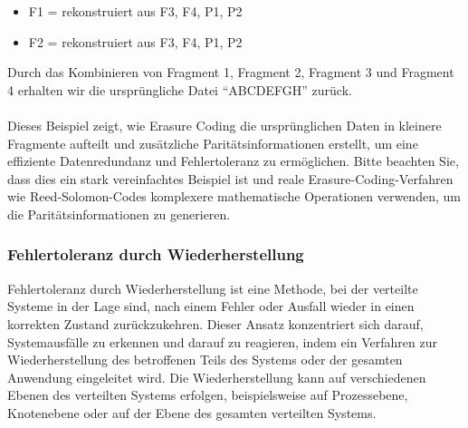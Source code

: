 \begin{itemize}
\item F1 = rekonstruiert aus F3, F4, P1, P2
\item F2 = rekonstruiert aus F3, F4, P1, P2
\end{itemize}  
Durch das Kombinieren von Fragment 1, Fragment 2, Fragment 3 und Fragment 4 erhalten wir die ursprüngliche Datei \enquote{ABCDEFGH} zurück.
\\\\
Dieses Beispiel zeigt, wie Erasure Coding die ursprünglichen Daten in kleinere Fragmente aufteilt und zusätzliche Paritätsinformationen erstellt, um eine effiziente Datenredundanz und Fehlertoleranz zu ermöglichen. Bitte beachten Sie, dass dies ein stark vereinfachtes Beispiel ist und reale Erasure-Coding-Verfahren wie Reed-Solomon-Codes komplexere mathematische Operationen verwenden, um die Paritätsinformationen zu generieren.

\subsubsection{Fehlertoleranz durch Wiederherstellung}

Fehlertoleranz durch Wiederherstellung ist eine Methode, bei der verteilte Systeme in der Lage sind, nach einem Fehler oder Ausfall wieder in einen korrekten Zustand zurückzukehren. Dieser Ansatz konzentriert sich darauf, Systemausfälle zu erkennen und darauf zu reagieren, indem ein Verfahren zur Wiederherstellung des betroffenen Teils des Systems oder der gesamten Anwendung eingeleitet wird. Die Wiederherstellung kann auf verschiedenen Ebenen des verteilten Systems erfolgen, beispielsweise auf Prozessebene, Knotenebene oder auf der Ebene des gesamten verteilten Systems.

